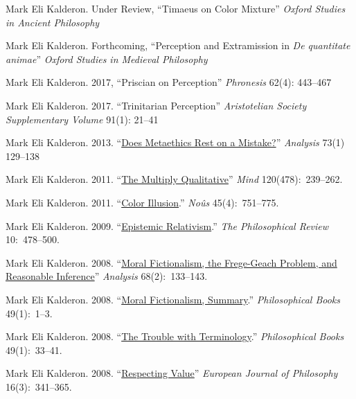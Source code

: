 \documentclass[11pt]{article}
\begin{document}

\ind Mark Eli Kalderon. Under Review, ``Timaeus on Color Mixture'' \emph{Oxford Studies in Ancient Philosophy}

\ind Mark Eli Kalderon. Forthcoming, ``Perception and Extramission in \emph{De quantitate animae}'' \emph{Oxford Studies in Medieval Philosophy}

\ind Mark Eli Kalderon. 2017, ``Priscian on Perception'' \emph{Phronesis} 62(4): 443--467

\ind Mark Eli Kalderon. 2017. ``Trinitarian Perception'' \emph{Aristotelian Society Supplementary Volume} 91(1): 21--41

\ind Mark Eli Kalderon. 2013. ``\href{http://dx.doi.org/10.1093/analys/ans147}{Does Metaethics Rest on a Mistake?}'' \emph{Analysis} 73(1) 129--138

\ind Mark Eli Kalderon. 2011. ``\href{http://mind.oxfordjournals.org/content/120/478/239.full.pdf+html}{The Multiply Qualitative}'' \emph{Mind} 120(478):~239--262. 

\ind Mark Eli Kalderon. 2011. ``\href{http://onlinelibrary.wiley.com/doi/10.1111/j.1468-0068.2010.00781.x/pdf}{Color Illusion}.''
 \emph{No{\^u}s} 45(4):~751--775.

\ind Mark Eli Kalderon. 2009. ``\href{http://philreview.dukejournals.org/content/118/2/225.full.pdf+html}{Epistemic Relativism}.'' \emph{The Philosophical Review} 10:~478--500. 

\ind Mark Eli Kalderon. 2008. ``\href{http://onlinelibrary.wiley.com/doi/10.1111/j.1467-8284.2007.00728.x/full}{Moral Fictionalism, the Frege-Geach Problem, and Reasonable Inference}'' \emph{Analysis} 68(2):~133--143. 


\ind Mark Eli Kalderon. 2008. ``\href{http://onlinelibrary.wiley.com/doi/10.1111/j.1468-0149.2008.454_1.x/pdf}{Moral Fictionalism, Summary}.'' \emph{Philosophical Books} 49(1):~1--3.


\ind Mark Eli Kalderon. 2008.  ``\href{http://onlinelibrary.wiley.com/doi/10.1111/j.1468-0149.2008.454_5.x/abstract}{The Trouble with Terminology}.'' \emph{Philosophical Books} 49(1):~33--41.


\ind Mark Eli Kalderon. 2008. ``\href{http://onlinelibrary.wiley.com/doi/10.1111/j.1468-0378.2008.00324.x/pdf}{Respecting Value}'' \emph{European Journal of Philosophy}
16(3):~341--365.
\end{document}
